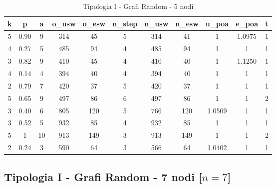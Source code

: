 \begin{table}[H]
\centering
\scalebox{0.9} {
\begin{tabular}{|c|c|c|c|c|c|c|c|c|c|c|}
\hline
\textbf{k} & \textbf{p} & \textbf{a} & \textbf{o\_usw} & \textbf{o\_esw} & \textbf{n\_step} & \textbf{n\_usw} & \textbf{n\_esw} & \textbf{u\_poa} & \textbf{e\_poa} & \textbf{t} \\ \hline
5 & 0.90 & 9 & 314 & 45 & 5 & 314 & 41 & 1 & 1.0975 & 1 \\ \hline
4 & 0.27 & 5 & 485 & 94 & 4 & 485 & 94 & 1 & 1 & 1 \\ \hline
3 & 0.82 & 9 & 410 & 45 & 4 & 410 & 40 & 1 & 1.1250 & 1 \\ \hline
4 & 0.14 & 4 & 394 & 40 & 4 & 394 & 40 & 1 & 1 & 1 \\ \hline
2 & 0.79 & 7 & 420 & 37 & 5 & 420 & 37 & 1 & 1 & 1 \\ \hline
5 & 0.65 & 9 & 497 & 86 & 6 & 497 & 86 & 1 & 1 & 2 \\ \hline
3 & 0.40 & 6 & 805 & 120 & 5 & 766 & 120 & 1.0509 & 1 & 1 \\ \hline
3 & 0.52 & 5 & 932 & 85 & 4 & 932 & 85 & 1 & 1 & 1 \\ \hline
5 & 1 & 10 & 913 & 149 & 3 & 913 & 149 & 1 & 1 & 2 \\ \hline
2 & 0.24 & 3 & 590 & 64 & 3 & 566 & 64 & 1.0402 & 1 & 1 \\ \hline
\end{tabular}
}
\caption{Tipologia I - Grafi Random - 5 nodi}
\label{tab:sperimentazione-tipo1-5nodi}
\end{table}

\subsection{Tipologia I - Grafi Random - 7 nodi [$n=7$]}

